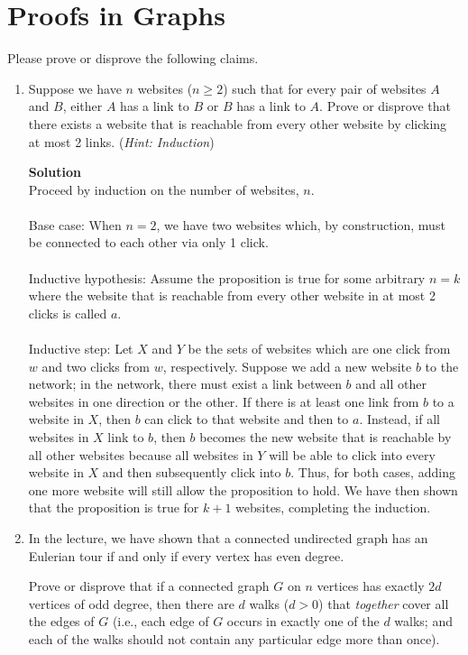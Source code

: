 \documentclass[11pt]{article}
\newcommand*{\Question}[1]{\section{#1}}
\newenvironment{Parts}{\begin{enumerate}[label=(\alph*)]}{\end{enumerate}}
\newcommand*{\Part}{\item}
\newenvironment{Answer}{\vspace{10pt}\begin{mdframed}\textbf{Solution}\\}{\end{mdframed}\vfill\pagebreak[3]}
\newenvironment{Answer}{\vspace{10pt}}{\vfill\pagebreak[3]}
\begin{document}
\Question{Proofs in Graphs} 

Please prove or disprove the following claims.

\begin{Parts}
\Part  Suppose we have $n$ websites ($n \geq 2$) such that for every pair of websites $A$ and $B$,
either $A$ has a link to $B$ or $B$ has a link to $A$. Prove or disprove that
there exists a website that is reachable from every other website by clicking at
most 2 links. (\textit{Hint: Induction})

\begin{Answer}

Proceed by induction on the number of websites, $n$.
\\
\\
Base case: When $n=2$, we have two websites which, by construction, must be connected to each other via only 1 click. 
\\
\\
Inductive hypothesis: Assume the proposition is true for some arbitrary $n=k$ where the website that is reachable from every other website in at most 2 clicks is called $a$.
\\
\\
Inductive step: Let $X$ and $Y$ be the sets of websites which are one click from $w$ and two clicks from $w$, respectively. Suppose we add a new website $b$ to the network; in the network, there must exist a link between $b$ and all other websites in one direction or the other. If there is at least one link from $b$ to a website in $X$, then $b$ can click to that website and then to $a$. Instead, if all websites in $X$ link to $b$, then $b$ becomes the new website that is reachable by all other websites because all websites in $Y$ will be able to click into every website in $X$ and then subsequently click into $b$. Thus, for both cases, adding one more website will still allow the proposition to hold. We have then shown that the proposition is true for $k+1$ websites, completing the induction.  

\end{Answer}

\Part  
In the lecture, we have shown that a connected undirected graph has an Eulerian tour if and only if every vertex has even degree.

Prove or disprove that if a connected graph $G$ on $n$ vertices has exactly $2d$ vertices of
odd degree, then there are $d$ walks ($d>0$) that \emph{together} cover all the edges of
$G$ (i.e., each edge of $G$ occurs in exactly one of the $d$ walks; and each of
the walks should not contain any particular edge more than once).


\end{Parts}
\end{document}
